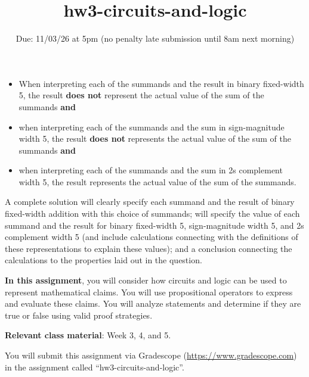 \begin{enumerate}[labelindent=0pt, leftmargin=0pt]
\begin{enumerate}
            \begin{itemize}
            \item[(1)] When interpreting each of the summands and the result in binary fixed-width 5, 
            the result {\bf does not} represent the actual value of the sum of the summands {\bf and}
            \item[(2)] when interpreting each of the summands and the sum in sign-magnitude width 5, the result  
            {\bf does not} represents the actual value of the sum of the summands {\bf and}
            \item[(3)] when interpreting each of the summands and the sum in 2s complement width 5, the result 
            represents the actual value of the sum of the summands.
            \end{itemize}
            A complete solution will clearly specify each summand and the result of binary fixed-width addition 
            with this choice of summands; will specify  the value of each summand and the result for 
            binary fixed-width 5, 
            sign-magnitude width 5, and 2s complement width 5 (and include calculations connecting with the 
            definitions of these representations to explain these values); and a conclusion connecting
            the calculations to the properties laid out in the question.
        \end{enumerate}  
\end{enumerate}
\newpage

\title{hw3-circuits-and-logic}
\date{Due: 11/03/26 at 5pm (no penalty late submission until 8am next morning)}

\maketitle
\thispagestyle{fancy}

{\bf In this assignment}, you will consider how circuits and logic can be used to represent
mathematical claims. You will use propositional operators
to express and evaluate these claims.  You will analyze statements and determine if they are true or false using valid proof strategies.

{\bf Relevant class material}: Week 3, 4, and 5.

You will submit this assignment via Gradescope
(\href{https://www.gradescope.com}{https://www.gradescope.com}) 
in the assignment called ``hw3-circuits-and-logic''.

\instructions

